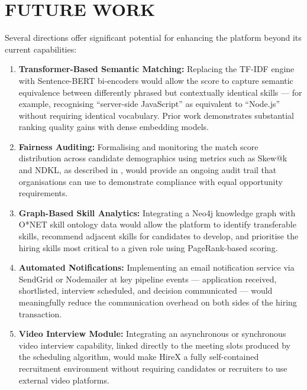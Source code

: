 \documentclass[12pt,a4paper]{report}
\begin{document}
\section{FUTURE WORK}

Several directions offer significant potential for enhancing the platform beyond its current capabilities:

\begin{enumerate}[leftmargin=0.5in, label=\arabic*., topsep=4pt, itemsep=3pt]
    \item \textbf{Transformer-Based Semantic Matching:} Replacing the TF-IDF engine with Sentence-BERT bi-encoders would allow the score to capture semantic equivalence between differently phrased but contextually identical skills — for example, recognising ``server-side JavaScript'' as equivalent to ``Node.js'' without requiring identical vocabulary. Prior work \cite{ref7} demonstrates substantial ranking quality gains with dense embedding models.

    \item \textbf{Fairness Auditing:} Formalising and monitoring the match score distribution across candidate demographics using metrics such as Skew@k and NDKL, as described in \cite{ref12}, would provide an ongoing audit trail that organisations can use to demonstrate compliance with equal opportunity requirements.

    \item \textbf{Graph-Based Skill Analytics:} Integrating a Neo4j knowledge graph with O*NET skill ontology data \cite{ref20} would allow the platform to identify transferable skills, recommend adjacent skills for candidates to develop, and prioritise the hiring skills most critical to a given role using PageRank-based scoring.

    \item \textbf{Automated Notifications:} Implementing an email notification service via SendGrid or Nodemailer at key pipeline events — application received, shortlisted, interview scheduled, and decision communicated — would meaningfully reduce the communication overhead on both sides of the hiring transaction.

    \item \textbf{Video Interview Module:} Integrating an asynchronous or synchronous video interview capability, linked directly to the meeting slots produced by the scheduling algorithm, would make HireX a fully self-contained recruitment environment without requiring candidates or recruiters to use external video platforms.


\end{enumerate}
\end{document}
